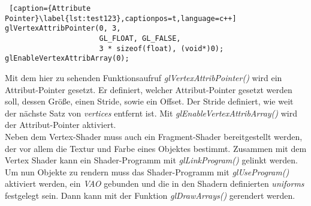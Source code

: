 \documentclass[11pt,a4paper]{article}
\begin{document}
\begin{lstlisting} [caption={Attribute Pointer}\label{lst:test123},captionpos=t,language=c++]
glVertexAttribPointer(0, 3,
                      GL_FLOAT, GL_FALSE,
                      3 * sizeof(float), (void*)0);
glEnableVertexAttribArray(0);
\end{lstlisting}
\noindent
Mit dem hier zu sehenden Funktionsaufruf \mbox{\textit{glVertexAttribPointer()}} wird ein Attribut-Pointer gesetzt. Er definiert, welcher Attribut-Pointer gesetzt werden soll, dessen Größe, einen Stride, sowie ein Offset. Der Stride definiert, wie weit der nächste Satz von \mbox{\textit{vertices}} entfernt ist. Mit \mbox{\textit{glEnableVertexAttribArray()}} wird der Attribut-Pointer aktiviert.\\
Neben dem Vertex-Shader muss auch ein Fragment-Shader bereitgestellt werden, der vor allem die Textur und Farbe eines Objektes bestimmt. Zusammen mit dem Vertex Shader kann ein Shader-Programm mit \mbox{\textit{glLinkProgram()}} gelinkt werden.\\
Um nun Objekte zu rendern muss das Shader-Programm mit \mbox{\textit{glUseProgram()}} aktiviert werden, ein \mbox{\textit{VAO}} gebunden und die in den Shadern definierten \mbox{\textit{uniforms}} festgelegt sein. Dann kann mit der Funktion \mbox{\textit{glDrawArrays()}} gerendert werden.
\end{document}
